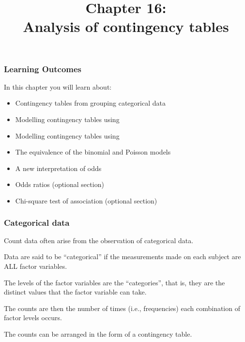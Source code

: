 \documentclass{beamer}\usepackage[]{graphicx}\usepackage[]{xcolor}
\begin{document}
\newcommand{\thechapter}{16}



\title{Chapter \thechapter: \\ Analysis of contingency tables}




\begin{frame}
\titlepage
\end{frame}


\begin{frame}[t]
\frametitle{Learning Outcomes}
In this chapter you will learn about:
\begin{center}
\vspace{16pt}
\begin{minipage}{0.95\textwidth}
  \begin{itemize}
  \item Contingency tables from grouping categorical data
  \item Modelling contingency tables using 
  \item Modelling contingency tables using 
  \item The equivalence of the binomial and Poisson models
  \item A new interpretation of odds
  \item Odds ratios (optional section)  
  \item Chi-square test of association (optional section)
  \end{itemize}
\end{minipage}
\end{center}
\end{frame}





\begin{frame}
\frametitle{Categorical data}
Count data often arise from the observation of categorical data.
\bigskip

Data are said to be ``categorical'' if the measurements made on each subject are ALL factor variables.
\bigskip

The levels of the factor variables are the ``categories'', that is, they are the distinct values that the factor variable can take.
\bigskip

The counts are then the number of times (i.e., frequencies) each combination of factor levels occurs.
\bigskip

The counts can be arranged in the form of a contingency table.
\end{frame}
\end{document}
